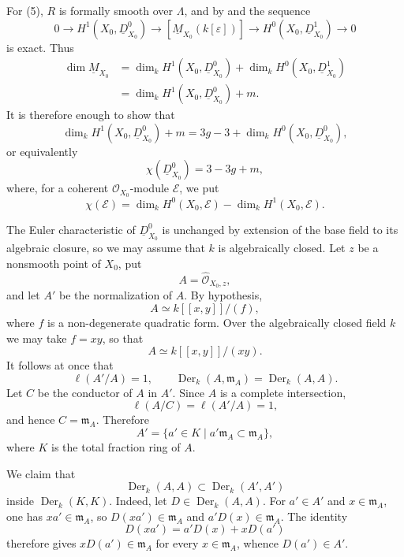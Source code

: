 For (5), $R$ is formally smooth over $\Lambda$, and by  and 
the sequence
\[
0\longrightarrow H^1(X_0,\underline D^0_{X_0})
 \longrightarrow[\underline M_{X_0}(k[\varepsilon])]
 \longrightarrow H^0(X_0,\underline D^1_{X_0})
 \longrightarrow0
\]
is exact. Thus
\[
\begin{aligned}
\dim\underline M_{X_0}
&=\dim_kH^1(X_0,\underline D^0_{X_0})
 +\dim_kH^0(X_0,\underline D^1_{X_0})\\
&=\dim_kH^1(X_0,\underline D^0_{X_0})+m.
\end{aligned}
\]
It is therefore enough to show that
\[
\dim_kH^1(X_0,\underline D^0_{X_0})+m
=3g-3+\dim_kH^0(X_0,\underline D^0_{X_0}),
\]
or equivalently
\[
\chi(\underline D^0_{X_0})=3-3g+m,
\]
where, for a coherent $\mathcal O_{X_0}$-module $\mathcal E$, we put
\[
\chi(\mathcal E)
=\dim_kH^0(X_0,\mathcal E)-\dim_kH^1(X_0,\mathcal E).
\]

The Euler characteristic of $\underline D^0_{X_0}$ is unchanged by
extension of the base field to its algebraic closure, so we may assume
that $k$ is algebraically closed. Let $z$ be a nonsmooth point of
$X_0$, put
\[
A=\widehat{\mathcal O}_{X_0,z},
\]
and let $A'$ be the normalization of $A$. By hypothesis,
\[
A\simeq k[[x,y]]/(f),
\]
where $f$ is a non-degenerate quadratic form. Over the algebraically
closed field $k$ we may take $f=xy$, so that
\[
A\simeq k[[x,y]]/(xy).
\]
It follows at once that
\[
\ell(A'/A)=1,
\qquad
\operatorname{Der}_k(A,\mathfrak m_A)
=\operatorname{Der}_k(A,A).
\]
Let $C$ be the conductor of $A$ in $A'$. Since $A$ is a complete
intersection,
\[
\ell(A/C)=\ell(A'/A)=1,
\]
and hence $C=\mathfrak m_A$. Therefore
\[
A'=\{a'\in K\mid a'\mathfrak m_A\subset\mathfrak m_A\},
\]
where $K$ is the total fraction ring of $A$.

We claim that
\[
\operatorname{Der}_k(A,A)
 \subset\operatorname{Der}_k(A',A')
\]
inside $\operatorname{Der}_k(K,K)$. Indeed, let
$D\in\operatorname{Der}_k(A,A)$. For $a'\in A'$ and
$x\in\mathfrak m_A$, one has $xa'\in\mathfrak m_A$, so
$D(xa')\in\mathfrak m_A$ and
$a'D(x)\in\mathfrak m_A$. The identity
\[
D(xa')=a'D(x)+xD(a')
\]
therefore gives $xD(a')\in\mathfrak m_A$ for every
$x\in\mathfrak m_A$, whence $D(a')\in A'$.


